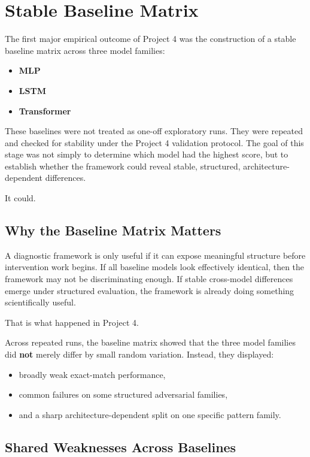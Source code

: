 \documentclass[11pt]{article}
\begin{document}
\section{Stable Baseline Matrix}

The first major empirical outcome of Project 4 was the construction of a stable baseline matrix across three model families:
\begin{itemize}[leftmargin=1.5em]
    \item \textbf{MLP}
    \item \textbf{LSTM}
    \item \textbf{Transformer}
\end{itemize}

These baselines were not treated as one-off exploratory runs. They were repeated and checked for stability under the Project 4 validation protocol. The goal of this stage was not simply to determine which model had the highest score, but to establish whether the framework could reveal stable, structured, architecture-dependent differences.

It could.

\subsection{Why the Baseline Matrix Matters}

A diagnostic framework is only useful if it can expose meaningful structure before intervention work begins. If all baseline models look effectively identical, then the framework may not be discriminating enough. If stable cross-model differences emerge under structured evaluation, the framework is already doing something scientifically useful.

That is what happened in Project 4.

Across repeated runs, the baseline matrix showed that the three model families did \textbf{not} merely differ by small random variation. Instead, they displayed:
\begin{itemize}[leftmargin=1.5em]
    \item broadly weak exact-match performance,
    \item common failures on some structured adversarial families,
    \item and a sharp architecture-dependent split on one specific pattern family.
\end{itemize}

\subsection{Shared Weaknesses Across Baselines}
\end{document}
